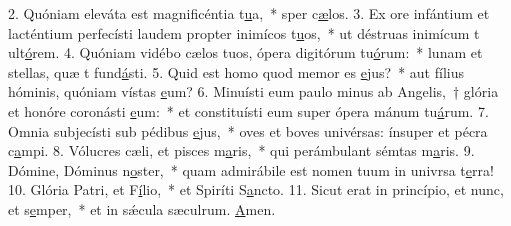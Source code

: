 2. Quóniam eleváta est magnificéntia t\uline{u}a,~* sper c\uline{æ}los.
3. Ex ore infántium et lacténtium perfecísti laudem propter inimícos t\uline{u}os,~* ut déstruas inimícum t ult\uline{ó}rem.
4. Quóniam vidébo cælos tuos, ópera digitórum tu\uline{ó}rum:~* lunam et stellas, quæ t fund\uline{á}sti.
5. Quid est homo quod memor es \uline{e}jus?~* aut fílius hóminis, quóniam vístas \uline{e}um?
6. Minuísti eum paulo minus ab Angelis,~† glória et honóre coronásti \uline{e}um:~* et constituísti eum super ópera mánum tu\uline{á}rum.
7. Omnia subjecísti sub pédibus \uline{e}jus,~* oves et boves univérsas: ínsuper et pécra c\uline{a}mpi.
8. Vólucres cæli, et pisces m\uline{a}ris,~* qui perámbulant sémtas m\uline{a}ris.
9. Dómine, Dóminus n\uline{o}ster,~* quam admirábile est nomen tuum in univrsa t\uline{e}rra!
10. Glória Patri, et F\uline{í}lio,~* et Spiríti S\uline{a}ncto.
11. Sicut erat in princípio, et nunc, et s\uline{e}mper,~* et in sǽcula sæculrum. \uline{A}men.
